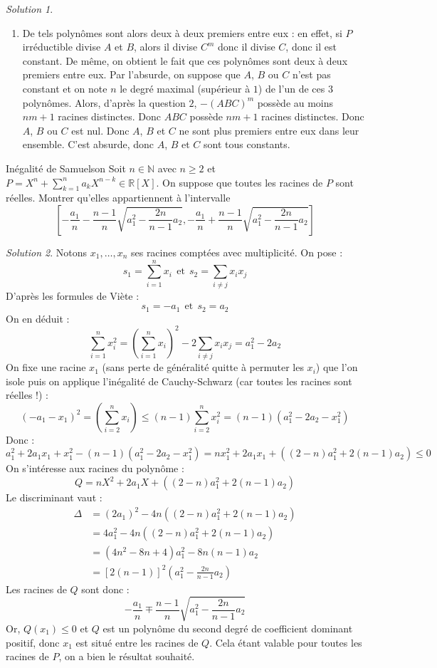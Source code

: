 \documentclass[french]{book}
\newcommand{\N}{\mathbb{N}}
\newcommand{\R}{\mathbb{R}}
\theoremstyle{definition}
\theoremstyle{remark}
\newtheorem*{sol}{Solution}
\begin{document}
\begin{sol}
\begin{enumerate}
		\item De tels polynômes sont alors deux à deux premiers entre eux : en effet, si $P$ irréductible divise $A$ et $B$, alors il divise $C^m$ donc il divise $C$, donc il est constant. De même, on obtient le fait que ces polynômes sont deux à deux premiers entre eux. Par l'absurde, on suppose que $A$, $B$ ou $C$ n'est pas constant et on note $n$ le degré maximal (supérieur à $1$) de l'un de ces $3$ polynômes. Alors, d'après la question $2$, $-(ABC)^m$ possède au moins $nm+1$ racines distinctes. Donc $ABC$ possède $nm+1$ racines distinctes. Donc $A$, $B$ ou $C$ est nul. Donc $A$, $B$ et $C$ ne sont plus premiers entre eux dans leur ensemble. C'est absurde, donc $A$, $B$ et $C$ sont tous constants.
	\end{enumerate}
\end{sol}


\begin{exo}[3]{Inégalité de Samuelson}
	Soit $n\in\N$ avec $n\geqslant 2$ et $P=\displaystyle X^n+\sum_{k=1}^{n}a_kX^{n-k}\in\R[X]$. On suppose que toutes les racines de $P$ sont réelles. Montrer qu'elles appartiennent à l'intervalle $$\left[-\frac{a_1}{n}-\frac{n-1}{n}\sqrt{a_1^2-\frac{2n}{n-1}a_2},-\frac{a_1}{n}+\frac{n-1}{n}\sqrt{a_1^2-\frac{2n}{n-1}a_2}\right]$$
\end{exo}
\begin{sol}
	Notons $x_1,\ldots,x_n$ ses racines comptées avec multiplicité. On pose : $$s_1=\sum_{i=1}^{n}x_i\ \ \text{et}\ \ s_2=\sum_{i\ne j}x_ix_j$$ D'après les formules de Viète : $$s_1=-a_1\ \ \text{et}\ \ s_2=a_2$$ On en déduit : $$\sum_{i=1}^{n}x_i^2=\left(\sum_{i=1}^{n}x_i\right)^2-2\sum_{i\ne j}x_ix_j=a_1^2-2a_2$$ On fixe une racine $x_1$ (sans perte de généralité quitte à permuter les $x_i$) que l'on isole puis on applique l'inégalité de Cauchy-Schwarz (car toutes les racines sont réelles !) : $$(-a_1-x_1)^2=\left(\sum_{i=2}^{n}x_i\right)\leqslant(n-1)\sum_{i=2}^{n}x_i^2=(n-1)(a_1^2-2a_2-x_1^2)$$
	Donc : $$a_1^2+2a_1x_1+x_1^2-(n-1)(a_1^2-2a_2-x_1^2)=nx_1^2+2a_1x_1+((2-n)a_1^2+2(n-1)a_2)\leqslant 0$$ On s'intéresse aux racines du polynôme : $$Q=nX^2+2a_1X+((2-n)a_1^2+2(n-1)a_2)$$ Le discriminant vaut :
	\begin{align*}
		\Delta&=(2a_1)^2-4n((2-n)a_1^2+2(n-1)a_2)\\
		&=4a_1^2-4n((2-n)a_1^2+2(n-1)a_2)\\
		&=(4n^2-8n+4)a_1^2-8n(n-1)a_2\\
		&=[2(n-1)]^2\left(a_1^2-\frac{2n}{n-1}a_2\right)
	\end{align*}
	Les racines de $Q$ sont donc : $$-\frac{a_1}{n}\mp\frac{n-1}{n}\sqrt{a_1^2-\frac{2n}{n-1}a_2}$$ Or, $Q(x_1)\leqslant 0$ et $Q$ est un polynôme du second degré de coefficient dominant positif, donc $x_1$ est situé entre les racines de $Q$. Cela étant valable pour toutes les racines de $P$, on a bien le résultat souhaité.
\end{sol}
\end{document}

